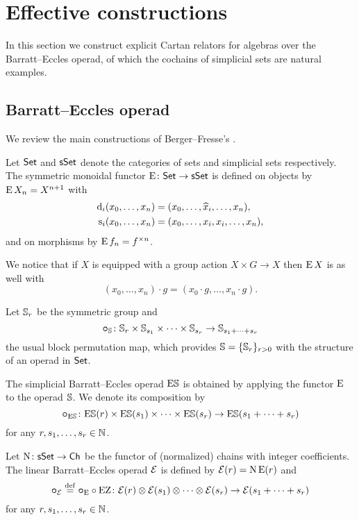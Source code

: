 
\section{Effective constructions}

In this section we construct explicit Cartan relators for algebras over the Barratt--Eccles operad, of which the cochains of simplicial sets are natural examples.

\subsection{Barratt--Eccles operad}

We review the main constructions of Berger--Fresse's \cite{berger2004combinatorial}.

Let $\mathsf{Set}$ and $\mathsf{sSet}$ denote the categories of sets and simplicial sets respectively.
The symmetric monoidal functor $\operatorname{E} \colon \mathsf{Set} \to \mathsf{sSet}$ is defined on objects by $\operatorname{E} X_n = X^{n+1}$ with
\[
\begin{split}
	\operatorname{d}_i(x_0,\dots,x_n) &= (x_0,\dots,\widehat{x}_i,\dots,x_n), \\
	\operatorname{s}_i(x_0,\dots,x_n) &= (x_0, \dots, x_i, x_i, \dots, x_n),
\end{split}
\]
and on morphisms by $\operatorname{E} f_n = f^{\times n}$.

We notice that if $X$ is equipped with a group action $X \times G \to X$ then $\operatorname{E} X$ is as well with
\[
(x_0,\dots,x_n) \cdot g = (x_0 \cdot g, \dots, x_n \cdot g).
\]

Let $\mathbb{S}_r$ be the symmetric group and
\[
\bm{\circ}_{\mathbb{S}} \colon \mathbb{S}_r \times \mathbb{S}_{s_1} \times \cdots \times \mathbb{S}_{s_r} \to \mathbb{S}_{s_1+\dots+s_r}
\]
the usual block permutation map, which provides $\mathbb{S} = \{\mathbb{S}_r\}_{r>0}$ with the structure of an operad in $\mathsf{Set}$.

The simplicial Barratt--Eccles operad $\mathrm{E}\mathbb{S}$ is obtained by applying the functor $\operatorname{E}$ to the operad $\mathbb{S}$.
We denote its composition by
\[
\bm{\circ}_{\mathrm{E}\mathbb{S}} \colon \mathrm{E}\mathbb{S}(r) \times \mathrm{E}\mathbb{S}(s_1) \times\dots\times \mathrm{E}\mathbb{S}(s_r) \to \mathrm{E}\mathbb{S}(s_1+\dots+s_r)
\]
for any $r,s_1,\dots,s_r \in \mathbb{N}$.

Let $\operatorname{N} \colon \mathsf{sSet} \to \mathsf{Ch}$ be the functor of (normalized) chains with integer coefficients.
The linear Barratt--Eccles operad $\mathcal{E}$ is defined by $\mathcal{E}(r) = \operatorname{N}\operatorname{E}(r)$ and
\[
\bm{\circ}_{\mathcal{E}} \stackrel{\mathrm{def}}{=} \bm{\circ}_{\operatorname{E}} \circ \operatorname{EZ} \colon \mathcal{E}(r) \otimes \mathcal{E}(s_1) \otimes\dotsb\otimes \mathcal{E}(s_r) \to \mathcal{E}(s_1+\dots+s_r)
\]
for any $r,s_1,\dots,s_r \in \mathbb{N}$.

